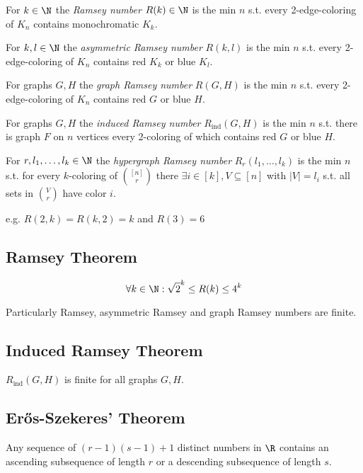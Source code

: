 For $k \in \N$ the \emph{Ramsey number} $R(k) \in \N$ is the min $n$ s.t. every 2-edge-coloring of $K_n$ contains monochromatic $K_k$.

\spacing

For $k, l \in \N$ the \emph{asymmetric Ramsey number} $R(k,l)$ is the min $n$ s.t. every 2-edge-coloring of $K_n$ contains red $K_k$ or blue $K_l$.

\spacing

For graphs $G, H$ the \emph{graph Ramsey number} $R(G,H)$ is the min $n$ s.t. every 2-edge-coloring of $K_n$ contains red $G$ or blue $H$.

\spacing

For graphs $G, H$ the \emph{induced Ramsey number} $R_\text{ind}(G,H)$ is the min $n$ s.t. there is graph $F$ on $n$ vertices every 2-coloring of which contains red $G$ or blue $H$.

\spacing

For $r, l_1, \dots, l_k \in \N$ the \emph{hypergraph Ramsey number} $R_r(l_1,\dots,l_k)$ is the min $n$ s.t. for every $k$-coloring of ${[n] \choose r}$ there $\exists i \in [k], V \subseteq [n]$ with $|V|=l_i$ s.t. all sets in $V \choose r$ have color $i$.

\spacing

e.g. $R(2,k) = R(k,2) = k$ and $R(3) = 6$

\subsection*{Ramsey Theorem}

$$\forall k \in \N : \sqrt{2}^k \leq R(k) \leq 4^k$$

Particularly Ramsey, asymmetric Ramsey and graph Ramsey numbers are finite.

\subsection*{Induced Ramsey Theorem}

$R_\text{ind}(G,H)$ is finite for all graphs $G, H$.

\subsection*{Er\H{o}s-Szekeres' Theorem}

Any sequence of $(r-1)(s-1)+1$ distinct numbers in $\R$ contains an ascending subsequence of length $r$ or a descending subsequence of length $s$.

